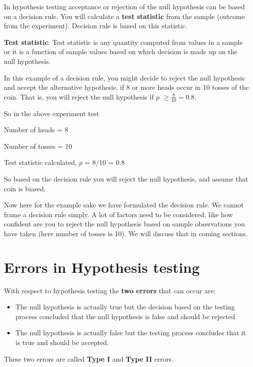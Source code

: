 \documentclass[
]{book}
\begin{document}
In hypothesis testing acceptance or rejection of the null hypothesis can be based on a decision rule. You will calculate a \textbf{test} \textbf{statistic} from the sample (outcome from the experiment). Decision rule is based on this statistic.

\textbf{Test statistic}: Test statistic is any quantity computed from values in a sample or it is a function of sample values based on which decision is made up on the null hypothesis.

In this example of a decision rule, you might decide to reject the null hypothesis and accept the alternative hypothesis, if 8 or more heads occur in 10 tosses of the coin. That is, you will reject the null hypothesis if \(p\) \(\geq \frac{8}{10} = 0.8\).

So in the above experiment test

Number of heads = 8

Number of tosses = 10

Test statistic calculated, \(p\) = 8/10 = 0.8

So based on the decision rule you will reject the null hypothesis, and assume that coin is biased.

Now here for the example sake we have formulated the decision rule. We cannot frame a decision rule simply. A lot of factors need to be considered, like how confident are you to reject the null hypothesis based on sample observations you have taken (here number of tosses is 10). We will discuss that in coming sections.

\hypertarget{errors-in-hypothesis-testing}{%
\section{Errors in Hypothesis testing}\label{errors-in-hypothesis-testing}}

With respect to hypothesis testing the \textbf{two errors} that can occur
are:

\begin{itemize}
\item
  The null hypothesis is actually true but the decision based on the testing process concluded that the null hypothesis is false and should be rejected
\item
  The null hypothesis is actually false but the testing process concludes that it is true and should be accepted.
\end{itemize}

These two errors are called \textbf{Type I} and \textbf{Type II} errors.~
\end{document}
